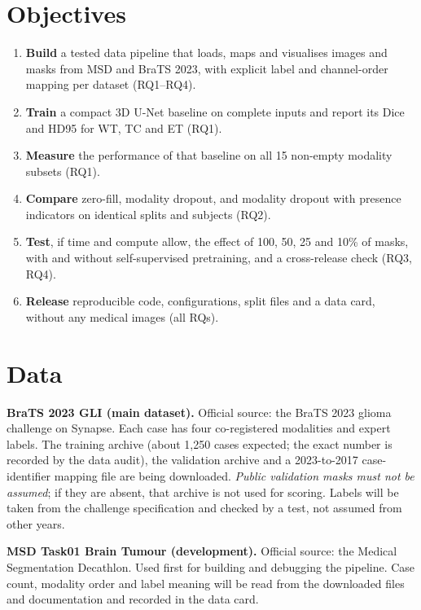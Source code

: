 \documentclass[11pt,a4paper]{article}
\begin{document}
\section{Objectives}
\begin{enumerate}
  \item \textbf{Build} a tested data pipeline that loads, maps and visualises images and masks from MSD and BraTS 2023, with explicit label and channel-order mapping per dataset (RQ1--RQ4).
  \item \textbf{Train} a compact 3D U-Net baseline on complete inputs and report its Dice and HD95 for WT, TC and ET (RQ1).
  \item \textbf{Measure} the performance of that baseline on all 15 non-empty modality subsets (RQ1).
  \item \textbf{Compare} zero-fill, modality dropout, and modality dropout with presence indicators on identical splits and subjects (RQ2).
  \item \textbf{Test}, if time and compute allow, the effect of 100, 50, 25 and 10\% of masks, with and without self-supervised pretraining, and a cross-release check (RQ3, RQ4).
  \item \textbf{Release} reproducible code, configurations, split files and a data card, without any medical images (all RQs).
\end{enumerate}

\section{Data}\label{sec:data}
\textbf{BraTS 2023 GLI (main dataset).} Official source: the BraTS 2023 glioma challenge on Synapse. Each case has four co-registered modalities and expert labels. The training archive (about 1,250 cases expected; the exact number is recorded by the data audit), the validation archive and a 2023-to-2017 case-identifier mapping file are being downloaded. \emph{Public validation masks must not be assumed}; if they are absent, that archive is not used for scoring. Labels will be taken from the challenge specification and checked by a test, not assumed from other years.

\textbf{MSD Task01 Brain Tumour (development).} Official source: the Medical Segmentation Decathlon. Used first for building and debugging the pipeline. Case count, modality order and label meaning will be read from the downloaded files and documentation and recorded in the data card.
\end{document}
